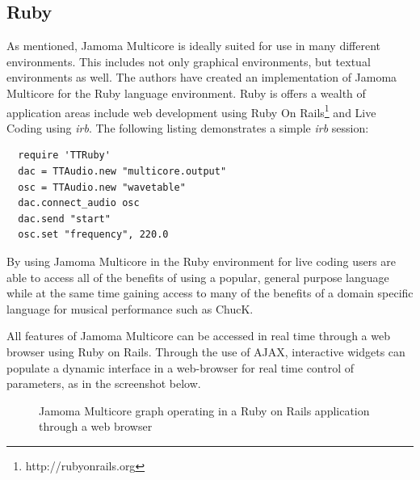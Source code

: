 \documentclass[twoside,a4paper]{article}
\begin{document}


\subsection{Ruby} %

As mentioned, Jamoma Multicore is ideally suited for use in many different environments. 
This includes not only graphical environments, but textual environments as well.  
The authors have created an implementation of Jamoma Multicore for the Ruby language environment.  
Ruby is offers a wealth of application areas include web development using Ruby On Rails\footnote{http://rubyonrails.org} and Live Coding\cite{Collins:2003} using \emph{irb}.  
The following listing demonstrates a simple \emph{irb} session:

\begin{lstlisting}
  require 'TTRuby'
  dac = TTAudio.new "multicore.output"
  osc = TTAudio.new "wavetable"
  dac.connect_audio osc
  dac.send "start"
  osc.set "frequency", 220.0
\end{lstlisting}

By using Jamoma Multicore in the Ruby environment for live coding users are able to access all of the benefits of using a popular, general purpose language while at the same time gaining access to many of the benefits of a domain specific language for musical performance such as ChucK.


All features of Jamoma Multicore can be accessed in real time through a web browser using Ruby on Rails.  Through the use of AJAX, interactive widgets can populate a dynamic interface in a web-browser for real time control of parameters, as in the screenshot below.

\begin{figure}[htbp]
\centerline{}
\caption{Jamoma Multicore graph operating in a Ruby on Rails application through a web browser}
\label{fig:rails}
\end{figure}
\end{document}
